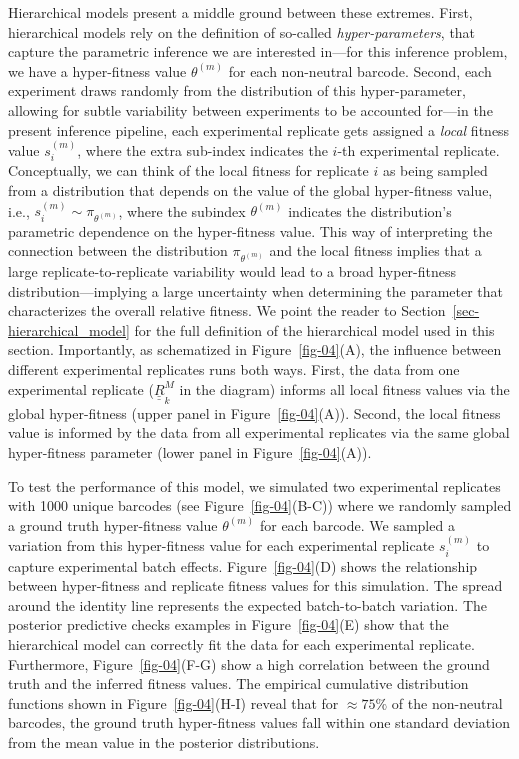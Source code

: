 \documentclass[
]{scrartcl}
\begin{document}
\begin{refsegment}
Hierarchical models present a middle ground between these extremes.
First, hierarchical models rely on the definition of so-called
\emph{hyper-parameters}, that capture the parametric inference we are
interested in---for this inference problem, we have a hyper-fitness
value \(\theta^{(m)}\) for each non-neutral barcode. Second, each
experiment draws randomly from the distribution of this hyper-parameter,
allowing for subtle variability between experiments to be accounted
for---in the present inference pipeline, each experimental replicate
gets assigned a \emph{local} fitness value \(s^{(m)}_i\), where the
extra sub-index indicates the \(i\)-th experimental replicate.
Conceptually, we can think of the local fitness for replicate \(i\) as
being sampled from a distribution that depends on the value of the
global hyper-fitness value, i.e., \(s^{(m)}_i \sim \pi_{\theta^{(m)}}\),
where the subindex \(\theta^{(m)}\) indicates the distribution's
parametric dependence on the hyper-fitness value. This way of
interpreting the connection between the distribution
\(\pi_{\theta^{(m)}}\) and the local fitness implies that a large
replicate-to-replicate variability would lead to a broad hyper-fitness
distribution---implying a large uncertainty when determining the
parameter that characterizes the overall relative fitness. We point the
reader to Section~\ref{sec-hierarchical_model} for the full definition
of the hierarchical model used in this section. Importantly, as
schematized in Figure~\ref{fig-04}(A), the influence between different
experimental replicates runs both ways. First, the data from one
experimental replicate (\(\underline{\underline{R}}^M_k\) in the
diagram) informs all local fitness values via the global hyper-fitness
(upper panel in Figure~\ref{fig-04}(A)). Second, the local fitness value
is informed by the data from all experimental replicates via the same
global hyper-fitness parameter (lower panel in Figure~\ref{fig-04}(A)).

To test the performance of this model, we simulated two experimental
replicates with 1000 unique barcodes (see Figure~\ref{fig-04}(B-C))
where we randomly sampled a ground truth hyper-fitness value
\(\theta^{(m)}\) for each barcode. We sampled a variation from this
hyper-fitness value for each experimental replicate \(s^{(m)}_i\) to
capture experimental batch effects. Figure~\ref{fig-04}(D) shows the
relationship between hyper-fitness and replicate fitness values for this
simulation. The spread around the identity line represents the expected
batch-to-batch variation. The posterior predictive checks examples in
Figure~\ref{fig-04}(E) show that the hierarchical model can correctly
fit the data for each experimental replicate. Furthermore,
Figure~\ref{fig-04}(F-G) show a high correlation between the ground
truth and the inferred fitness values. The empirical cumulative
distribution functions shown in Figure~\ref{fig-04}(H-I) reveal that for
\(\approx 75\%\) of the non-neutral barcodes, the ground truth
hyper-fitness values fall within one standard deviation from the mean
value in the posterior distributions.


\end{refsegment}
\end{document}
